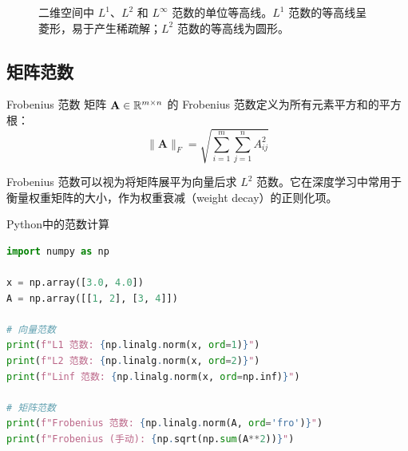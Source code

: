 \begin{figure}[H]
\centering
{}
\caption{二维空间中 $L^1$、$L^2$ 和 $L^{\infty}$ 范数的单位等高线。$L^1$ 范数的等高线呈菱形，易于产生稀疏解；$L^2$ 范数的等高线为圆形。}
\label{fig:vector-norms}
\end{figure}

\subsection{矩阵范数}

\begin{mydefinition}{Frobenius 范数}
矩阵 $\mathbf{A}\in\mathbb{R}^{m\times n}$ 的 Frobenius 范数定义为所有元素平方和的平方根：
\[
\|\mathbf{A}\|_F = \sqrt{\sum_{i=1}^{m}\sum_{j=1}^{n} A_{ij}^2}
\]
\end{mydefinition}

Frobenius 范数可以视为将矩阵展平为向量后求 $L^2$ 范数。它在深度学习中常用于衡量权重矩阵的大小，作为权重衰减（weight decay）的正则化项。

\begin{mycode}{Python中的范数计算}
\begin{lstlisting}[language=Python]
import numpy as np

x = np.array([3.0, 4.0])
A = np.array([[1, 2], [3, 4]])

# 向量范数
print(f"L1 范数: {np.linalg.norm(x, ord=1)}")
print(f"L2 范数: {np.linalg.norm(x, ord=2)}")
print(f"Linf 范数: {np.linalg.norm(x, ord=np.inf)}")

# 矩阵范数
print(f"Frobenius 范数: {np.linalg.norm(A, ord='fro')}")
print(f"Frobenius (手动): {np.sqrt(np.sum(A**2))}")
\end{lstlisting}
\end{mycode}

